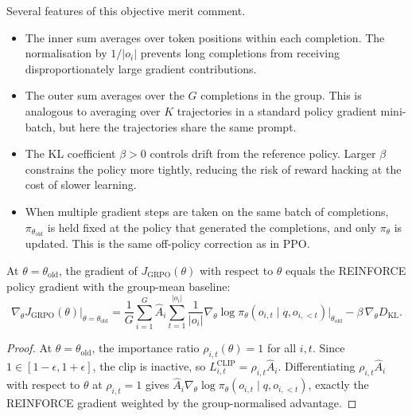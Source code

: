 Several features of this objective merit comment.

\begin{itemize}[leftmargin=*]
\item The inner sum averages over token positions within each completion.  The normalisation by $1/|o_i|$ prevents long completions from receiving disproportionately large gradient contributions.
\item The outer sum averages over the $G$ completions in the group.  This is analogous to averaging over $K$ trajectories in a standard policy gradient mini-batch, but here the trajectories share the same prompt.
\item The KL coefficient $\beta > 0$ controls drift from the reference policy.  Larger $\beta$ constrains the policy more tightly, reducing the risk of reward hacking at the cost of slower learning.
\item When multiple gradient steps are taken on the same batch of completions, $\pi_{\theta_\mathrm{old}}$ is held fixed at the policy that generated the completions, and only $\pi_\theta$ is updated.  This is the same off-policy correction as in PPO.
\end{itemize}

\begin{proposition}
\label{prop:grpo-local-gradient}
At $\theta = \theta_\mathrm{old}$, the gradient of $J_{\mathrm{GRPO}}(\theta)$ with respect to $\theta$ equals the REINFORCE policy gradient with the group-mean baseline:
\begin{equation}
\label{eq:grpo-local-grad}
\nabla_\theta J_{\mathrm{GRPO}}(\theta)\big|_{\theta = \theta_\mathrm{old}}
= \frac{1}{G}\sum_{i=1}^G \hat{A}_i \sum_{t=1}^{|o_i|} \frac{1}{|o_i|}\nabla_\theta \log \pi_\theta(o_{i,t} \mid q, o_{i,<t})\Big|_{\theta_\mathrm{old}}
- \beta\,\nabla_\theta D_{\mathrm{KL}}.
\end{equation}
\end{proposition}

\begin{proof}
At $\theta = \theta_\mathrm{old}$, the importance ratio $\rho_{i,t}(\theta) = 1$ for all $i, t$.  Since $1 \in [1-\epsilon, 1+\epsilon]$, the clip is inactive, so $L_{i,t}^{\mathrm{CLIP}} = \rho_{i,t}\hat{A}_i$.  Differentiating $\rho_{i,t}\hat{A}_i$ with respect to $\theta$ at $\rho_{i,t} = 1$ gives $\hat{A}_i \nabla_\theta \log \pi_\theta(o_{i,t} \mid q, o_{i,<t})$, exactly the REINFORCE gradient weighted by the group-normalised advantage.
\end{proof}

